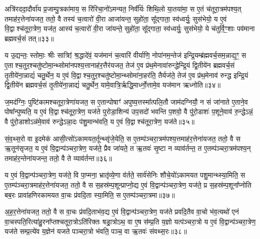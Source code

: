{\anuvakamend[{लो॒कान्ग॑मयति॒ सावि॑द्वान्थ्सु॒शेवा॒ मावि॑श॒ यज॑मान॒न्द्वाद॑श च॥७॥}]}

अत्रि॑रददा॒दौर्वा॑य प्र॒जाम्पु॒त्रका॑माय॒ स रि॑रिचा॒नो॑\-ऽमन्यत॒ निर्वी᳚र्यः शिथि॒लो या॒तया॑मा॒ स ए॒तं च॑तूरा॒त्रम॑पश्य॒त् तमाह॑र॒त्तेना॑यजत॒ ततो॒ वै तस्य॑ च॒त्वारो॑ वी॒रा आजा॑यन्त॒ सुहो॑ता॒ सू᳚द्गाता॒ स्व॑ध्वर्युः॒ सुस॑भेयो॒ य ए॒वं वि॒द्वाश्च॑तूरा॒त्रेण॒ यज॑त॒ आस्य॑ च॒त्वारो॑ वी॒रा जा॑यन्ते॒ सुहो॑ता॒ सू᳚द्गाता॒ स्व॑ध्वर्युः॒ सुस॑भेयो॒ ये च॑तुर्वि॒ꣳ॒शाः पव॑माना ब्रह्मवर्च॒सं तत्॥३३॥

य उ॒द्यन्तः॒ स्तोमाः॒ श्रीः सात्रिꣵ॑ श्र॒द्धादे॑वं॒ यज॑मानं च॒त्वारि॑ वीर्याणि॒ नोपा॑नम॒न्तेज॑ इन्द्रि॒यम्ब्र॑ह्मवर्च॒सम॒न्नाद्य॒ꣳ॒ स ए॒ताश्च॒तुर॒श्चतु॑ष्टोमा॒न्थ्सोमा॑नपश्य॒त्तानाह॑र॒त्तैर॑यजत॒ तेज॑ ए॒व प्र॑थ॒मेनावा॑रुन्द्धेन्द्रि॒यं द्वि॒तीये॑न ब्रह्मवर्च॒सं तृ॒तीये॑ना॒न्नाद्यं॑ चतु॒र्थेन॒ य ए॒वं वि॒द्वाश्च॒तुर॒श्चतु॑ष्टोमा॒न्थ्सोमा॑ना॒हर॑ति॒ तैर्यज॑ते॒ तेज॑ ए॒व प्र॑थ॒मेनाव॑ रुन्द्ध इन्द्रि॒यं द्वि॒तीये॑न ब्रह्मवर्च॒सं तृ॒तीये॑ना॒न्नाद्यं॑ चतु॒र्थेन॒ यामे॒वात्रि॒र्\mbox{}ऋद्धि॒मार्ध्नो॒त्तामे॒व यज॑मान ऋध्नोति॥३४॥

{\anuvakamend[{तत्तेज॑ ए॒वाष्टाद॑श च॥८॥}]}

ज॒मद॑ग्निः॒ पुष्टि॑कामश्चतूरा॒त्रेणा॑यजत॒ स ए॒तान्पोषाꣳ॑ अपुष्य॒त्तस्मा᳚त्पलि॒तौ जाम॑दग्नियौ॒ न सं जा॑नाते ए॒ताने॒व पोषा᳚न्पुष्यति॒ य ए॒वं वि॒द्वाश्च॑तूरा॒त्रेण॒ यज॑ते पुरोडा॒शिन्य॑ उप॒सदो॑ भवन्ति प॒शवो॒ वै पु॑रो॒डाशः॑ प॒शूने॒वाव॑ रु॒न्द्धे\-ऽन्नं॒ वै पु॑रो॒डाशो\-ऽन्न॑मे॒वाव॑ रुन्द्धे\-ऽन्ना॒दः प॑शु॒मान्भ॑वति॒ य ए॒वं वि॒द्वाश्च॑तूरा॒त्रेण॒ यज॑ते॥३५॥

{\anuvakamend[{ज॒मद॑ग्निर॒ष्टाच॑त्वारिशत्॥९॥}]}

सं॒व॒थ्स॒रो वा इ॒दमेक॑ आसी॒त्सो॑\-ऽकामयत॒र्तून्थ्सृ॑जे॒येति॒ स ए॒तम्प॑ञ्चरा॒त्रम॑पश्य॒त्तमाह॑र॒त्तेना॑यजत॒ ततो॒ वै स ऋ॒तून॑सृजत॒ य ए॒वं वि॒द्वान्प॑ञ्चरा॒त्रेण॒ यज॑ते॒ प्रैव जा॑यते॒ त ऋ॒तवः॑ सृ॒ष्टा न व्याव॑र्तन्त॒ त ए॒तम्प॑ञ्चरा॒त्रम॑पश्य॒न् तमाह॑र॒न्तेना॑यजन्त॒ ततो॒ वै ते व्याव॑र्तन्त॥३६॥

य ए॒वं वि॒द्वान्प॑ञ्चरा॒त्रेण॒ यज॑ते॒ वि पा॒प्मना॒ भ्रातृ॑व्ये॒णा व॑र्तते॒ सार्व॑सेनिः शौचे॒यो॑\-ऽकामयत पशु॒मान्थ्स्या॒मिति॒ स ए॒तम्प॑ञ्चरा॒त्रमाह॑र॒त्तेना॑यजत॒ ततो॒ वै स स॒हस्र॑म्प॒शून्प्राप्नो॒द्य ए॒वं वि॒द्वान्प॑ञ्चरा॒त्रेण॒ यज॑ते॒ प्र स॒हस्र॑म्प॒शूना᳚प्नोति बब॒रः प्रावा॑हणिरकामयत वा॒चः प्र॑वदि॒ता स्या॒मिति॒ स ए॒तम्प॑ञ्चरा॒त्रमा॥३७॥

अ॒ह॒र॒त्तेना॑यजत॒ ततो॒ वै स वा॒चः प्र॑वदि॒ताभ॑व॒द्य ए॒वं वि॒द्वान्प॑ञ्चरा॒त्रेण॒ यज॑ते प्रवदि॒तैव वा॒चो भ॑व॒त्यथो॑ एनं वा॒चस्पति॒रित्या॑हु॒रना᳚प्तश्चतूरा॒त्रो\-ऽति॑रिक्तः षड्रा॒त्रो\-ऽथ॒ वा ए॒ष स॑म्प्र॒ति य॒ज्ञो यत्प॑ञ्चरा॒त्रो य ए॒वं वि॒द्वान्प॑ञ्चरा॒त्रेण॒ यज॑ते सम्प्र॒त्ये॑व य॒ज्ञेन॑ यजते पञ्चरा॒त्रो भ॑वति॒ पञ्च॒ वा ऋ॒तवः॑ संवथ्स॒रः॥३८॥


